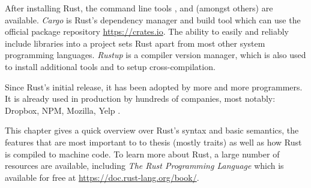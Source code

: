 After installing Rust, the command line tools ,  and  (amongst others) are available.
\emph{Cargo} is Rust's dependency manager and build tool which can use the official package repository \url{https://crates.io}.
The ability to easily and reliably include libraries into a project sets Rust apart from most other system programming languages.
\emph{Rustup} is a compiler version manager, which is also used to install additional tools and to setup cross-compilation.

Since Rust's initial release, it has been adopted by more and more programmers.
It is already used in production by hundreds of companies, most notably: Dropbox, NPM, Mozilla, Yelp \cite{rust-production}.

This chapter gives a quick overview over Rust's syntax and basic semantics, the features that are most important to to thesis (mostly traits) as well as how Rust is compiled to machine code. To learn more about Rust, a large number of resources are available, including \emph{The Rust Programming Language} \cite{klabnik2018rust} which is available for free at \url{https://doc.rust-lang.org/book/}.









